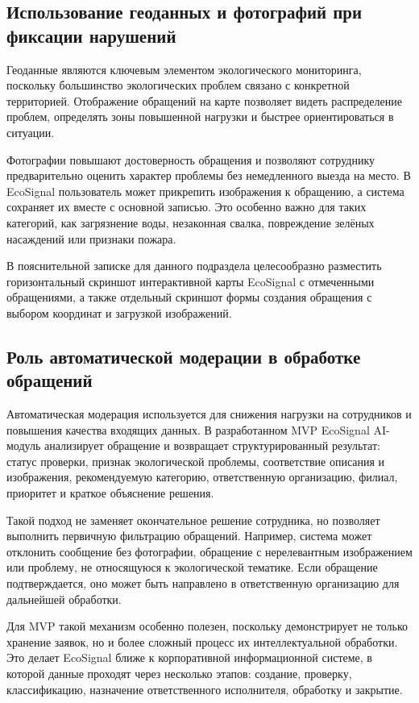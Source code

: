 \documentclass[14pt,a4paper]{extarticle}
\begin{document}
\subsection{Использование геоданных и фотографий при фиксации нарушений}

Геоданные являются ключевым элементом экологического мониторинга, поскольку большинство экологических проблем связано с конкретной территорией. Отображение обращений на карте позволяет видеть распределение проблем, определять зоны повышенной нагрузки и быстрее ориентироваться в ситуации.

Фотографии повышают достоверность обращения и позволяют сотруднику предварительно оценить характер проблемы без немедленного выезда на место. В EcoSignal пользователь может прикрепить изображения к обращению, а система сохраняет их вместе с основной записью. Это особенно важно для таких категорий, как загрязнение воды, незаконная свалка, повреждение зелёных насаждений или признаки пожара.

В пояснительной записке для данного подраздела целесообразно разместить горизонтальный скриншот интерактивной карты EcoSignal с отмеченными обращениями, а также отдельный скриншот формы создания обращения с выбором координат и загрузкой изображений.

\subsection{Роль автоматической модерации в обработке обращений}

Автоматическая модерация используется для снижения нагрузки на сотрудников и повышения качества входящих данных. В разработанном MVP EcoSignal AI-модуль анализирует обращение и возвращает структурированный результат: статус проверки, признак экологической проблемы, соответствие описания и изображения, рекомендуемую категорию, ответственную организацию, филиал, приоритет и краткое объяснение решения.

Такой подход не заменяет окончательное решение сотрудника, но позволяет выполнить первичную фильтрацию обращений. Например, система может отклонить сообщение без фотографии, обращение с нерелевантным изображением или проблему, не относящуюся к экологической тематике. Если обращение подтверждается, оно может быть направлено в ответственную организацию для дальнейшей обработки.

Для MVP такой механизм особенно полезен, поскольку демонстрирует не только хранение заявок, но и более сложный процесс их интеллектуальной обработки. Это делает EcoSignal ближе к корпоративной информационной системе, в которой данные проходят через несколько этапов: создание, проверку, классификацию, назначение ответственного исполнителя, обработку и закрытие.
\end{document}
